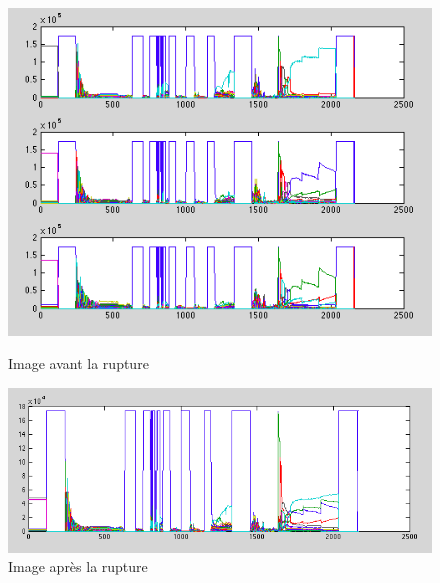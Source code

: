 \begin{figure}[h!]
   \begin{minipage}[c]{.46\linewidth}
	  \centering
      \includegraphics[scale=0.4]{img/diagRGB.png}
      \caption{\label{Avant} Image avant la rupture}
   \end{minipage} \hfill
   \begin{minipage}[c]{.46\linewidth}
      \centering
      \includegraphics[scale=0.35]{img/diagGris.png}
      \caption{\label{Après} Image après la rupture}
   \end{minipage}
\end{figure}